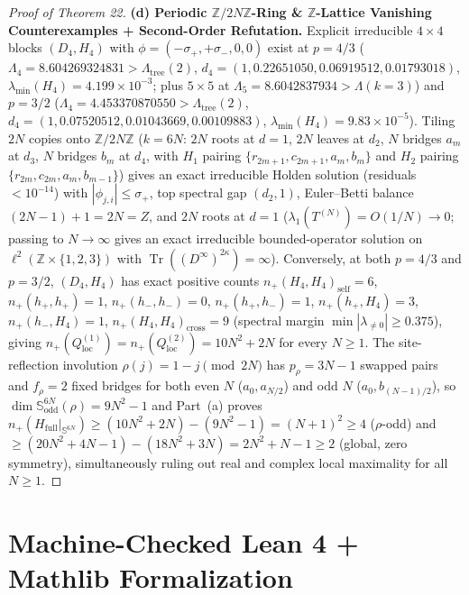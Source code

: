 \documentclass[10pt,letterpaper]{article}
\newcommand{\Tr}{\operatorname{Tr}}
\begin{document}
\begin{proof}[Proof of Theorem 22]
\textbf{(d) Periodic $\mathbb{Z}/2N\mathbb{Z}$-Ring \& $\mathbb{Z}$-Lattice Vanishing Counterexamples + Second-Order Refutation.}
Explicit irreducible $4\times 4$ blocks $(D_4, H_4)$ with $\phi = (-\sigma_+, +\sigma_-, 0, 0)$ exist at $p = 4/3$ ($\Lambda_4 = 8.604269324831 > \Lambda_{\mathrm{tree}}(2)$, $d_4 = (1, 0.22651050, 0.06919512, 0.01793018)$, $\lambda_{\min}(H_4) = 4.199\times 10^{-3}$; plus $5\times 5$ at $\Lambda_5 = 8.6042837934 > \Lambda(k=3)$) and $p = 3/2$ ($\Lambda_4 = 4.453370870550 > \Lambda_{\mathrm{tree}}(2)$, $d_4 = (1, 0.07520512, 0.01043669, 0.00109883)$, $\lambda_{\min}(H_4) = 9.83\times 10^{-5}$). Tiling $2N$ copies onto $\mathbb{Z}/2N\mathbb{Z}$ ($k = 6N$: $2N$ roots at $d = 1$, $2N$ leaves at $d_2$, $N$ bridges $a_m$ at $d_3$, $N$ bridges $b_m$ at $d_4$, with $H_1$ pairing $\{r_{2m+1}, c_{2m+1}, a_m, b_m\}$ and $H_2$ pairing $\{r_{2m}, c_{2m}, a_m, b_{m-1}\}$) gives an exact irreducible Holden solution (residuals $< 10^{-14}$) with $|\phi_{j,i}| \le \sigma_+$, top spectral gap $(d_2, 1)$, Euler--Betti balance $(2N-1) + 1 = 2N = Z$, and $2N$ roots at $d = 1$ ($\lambda_1(T^{(N)}) = O(1/N) \to 0$; passing to $N \to \infty$ gives an exact irreducible bounded-operator solution on $\ell^2(\mathbb{Z}\times\{1,2,3\})$ with $\Tr((D^\infty)^{2\kappa}) = \infty$). Conversely, at both $p = 4/3$ and $p = 3/2$, $(D_4, H_4)$ has exact positive counts $n_+(H_4, H_4)_{\mathrm{self}} = 6$, $n_+(h_+, h_+) = 1$, $n_+(h_-, h_-) = 0$, $n_+(h_+, h_-) = 1$, $n_+(h_+, H_4) = 3$, $n_+(h_-, H_4) = 1$, $n_+(H_4, H_4)_{\mathrm{cross}} = 9$ (spectral margin $\min|\lambda_{\neq 0}| \ge 0.375$), giving $n_+(Q_{\mathrm{loc}}^{(1)}) = n_+(Q_{\mathrm{loc}}^{(2)}) = 10N^2 + 2N$ for every $N \ge 1$. The site-reflection involution $\rho(j) = 1 - j \pmod{2N}$ has $p_\rho = 3N - 1$ swapped pairs and $f_\rho = 2$ fixed bridges for both even $N$ ($a_0, a_{N/2}$) and odd $N$ ($a_0, b_{(N-1)/2}$), so $\dim\mathbb{S}^{6N}_{\mathrm{odd}}(\rho) = 9N^2 - 1$ and Part~(a) proves $n_+(H_{\mathrm{full}}|_{\mathbb{S}^{6N}}) \ge (10N^2+2N) - (9N^2-1) = (N+1)^2 \ge 4$ ($\rho$-odd) and $\ge (20N^2+4N-1) - (18N^2+3N) = 2N^2 + N - 1 \ge 2$ (global, zero symmetry), simultaneously ruling out real and complex local maximality for all $N \ge 1$.
\end{proof}

\section{Machine-Checked Lean 4 + Mathlib Formalization}\label{sec:lean}
\end{document}
